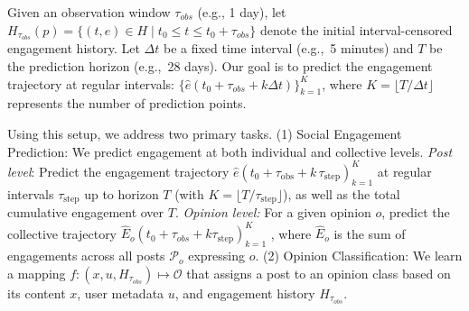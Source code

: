 Given an observation window $\tau_{obs}$ (e.g., 1 day), let $H_{\tau_{obs}}(p) = \{(t, e) \in H \mid t_0 \leq t \leq t_0 + \tau_{obs}\}$ denote the initial interval-censored engagement history. Let $\Delta t$ be a fixed time interval (e.g.,\ 5 minutes) and $T$ be the prediction horizon (e.g.,\ 28 days). Our goal is to predict the engagement trajectory at regular intervals: $\{\hat{e}(t_0 + \tau_{obs} + k\Delta t)\}_{k=1}^{K}$, where $K = \lfloor T/\Delta t \rfloor$ represents the number of prediction points.


Using this setup, we address two primary tasks. 
(1) Social Engagement Prediction: We predict engagement at both individual and collective levels. 
\emph{Post level}: Predict the engagement trajectory $\hat{e}(t_0 + \tau_{\text{obs}} + k\,\tau_{\text{step}})_{k=1}^{K}$ at regular intervals $\tau_{\text{step}}$ up to horizon $T$ (with $K = \lfloor T/\tau_{\text{step}} \rfloor$), as well as the total cumulative engagement over $T$. 
\emph{Opinion level:} For a given opinion \(o\), predict the collective trajectory ${\hat{E}_o(t_0 + \tau_{obs} + k\tau_{\text{step}})}_{k=1}^{K}$ , where $\hat{E}_o$ is the sum of engagements across all posts $\mathcal{P}_o$ expressing $o$. 
(2) Opinion Classification: We learn a mapping $f: (x, u, H_{\tau_{obs}}) \mapsto \mathcal{O}$ that assigns a post to an opinion class based on its content $x$, user metadata $u$, and engagement history $H_{\tau_{obs}}$.



